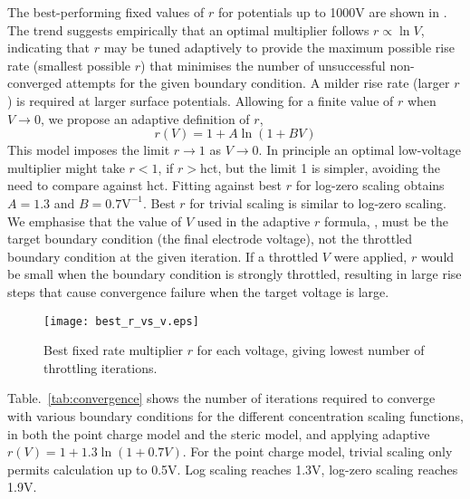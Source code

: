 The best-performing fixed values of $r$  for potentials up to 1000V are shown
in  . The trend suggests empirically that an
optimal multiplier follows
$r \propto \ln V$, indicating that $r$ 
may be tuned adaptively to provide the maximum possible rise rate (smallest
possible $r$) that minimises the number of unsuccessful non-converged
attempts for the given boundary condition.  A milder
rise rate (larger $r$) is required at larger surface potentials.
Allowing for a finite value of $r$ when $V \rightarrow 0$, we propose
an adaptive definition of $r$,
\begin{equation}
  r(V) = 1 + A \ln(1 + B V)
  \label{adaptive_r}
\end{equation}
This model imposes the limit $r \rightarrow 1$ as $V \rightarrow 0$.
In principle an optimal low-voltage multiplier might take $r<1$, if
$r>$hct, but the limit 1 is simpler, avoiding the need to 
compare against hct.  Fitting against best $r$ for log-zero scaling
obtains $A=1.3$ and $B=0.7 \textrm{V}^{-1}$. Best $r$ for trivial
scaling is similar to log-zero scaling.
We emphasise that the value of $V$ used in the adaptive $r$ formula, ,
must be the target boundary condition (the final electrode voltage),
not the throttled boundary condition at the given iteration.  If a throttled $V$ were
applied, $r$ would be small when the boundary condition is strongly
throttled, resulting in large rise steps that cause convergence
failure when the  target voltage is large.


\begin{figure}
\centering
\texttt{[image: best\_r\_vs\_v.eps]}
\caption{Best fixed rate multiplier $r$ for each voltage, giving lowest
  number of throttling iterations.
}
\label{fig:best_throttle_rate}
\end{figure}



Table.~\ref{tab:convergence} shows  the number of iterations required
to converge with various boundary conditions for the different
concentration scaling functions, in both the point charge model and the
steric model, and applying adaptive
$r(V)=1+1.3\ln(1+0.7V)$. For the point charge model, trivial scaling only
permits calculation up to 0.5V. Log scaling reaches 1.3V, log-zero
scaling reaches 1.9V.

